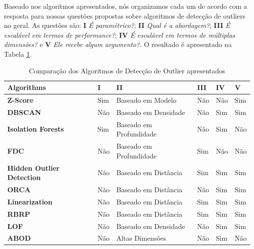 \vspace{25pt}

Baseado nos algoritmos apresentados, nós organizamos cada um de acordo com a resposta para nossas questões propostas sobre algoritmos de detecção de outliers no geral. As questões são: \textbf{I} \textit{É paramétrico?}; \textbf{II} \textit{Qual é a abordagem?}; \textbf{III} \textit{É escalável em termos de performance?}; \textbf{IV} \textit{É escalável em termos de múltiplas dimensões?} e \textbf{V} \textit{Ele recebe algum argumento?}. O resultado é apresentado na Tabela \ref{table:algorithms-comparison}.

\begin{table}[!h]
	\centering
	\begin{tabular}{|l|l|l|l|l|l|}
		\hline
		\textbf{Algorithms}               & \textbf{I} & \textbf{II}             & \textbf{III} & \textbf{IV} & \textbf{V} \\ \hline
		\textbf{Z-Score}                  & Sim        & Baseado em Modelo       & Não          & Não         & Sim        \\ \hline
		\textbf{DBSCAN}                   & Não        & Baseado em Densidade    & Não          & Sim         & Sim        \\ \hline
		\textbf{Isolation Forests}        & Sim        & Baseado em Profundidade & Não          & Sim         & Não        \\ \hline
		\textbf{FDC}                      & Não        & Baseado em Profundidade & Sim          & Não         & Não        \\ \hline
		\textbf{Hidden Outlier Detection} & Não        & Baseado em Distância    & Sim          & Sim         & Sim        \\ \hline
		\textbf{ORCA}                     & Não        & Baseado em Distância    & Não          & Sim         & Sim        \\ \hline
		\textbf{Linearization}            & Não        & Baseado em Distância    & Sim          & Sim         & Sim        \\ \hline
		\textbf{RBRP}                     & Não        & Baseado em Distância    & Sim          & Sim         & Sim        \\ \hline
		\textbf{LOF}                      & Não        & Baseado em Densidade    & Não          & Sim         & Sim        \\ \hline
		\textbf{ABOD}                     & Não        & Altas Dimensões         & Não          & Sim         & Não        \\ \hline
	\end{tabular}
	\caption{Comparação dos Algoritmos de Detecção de Outlier apresentados}
	\label{table:algorithms-comparison}
\end{table}

